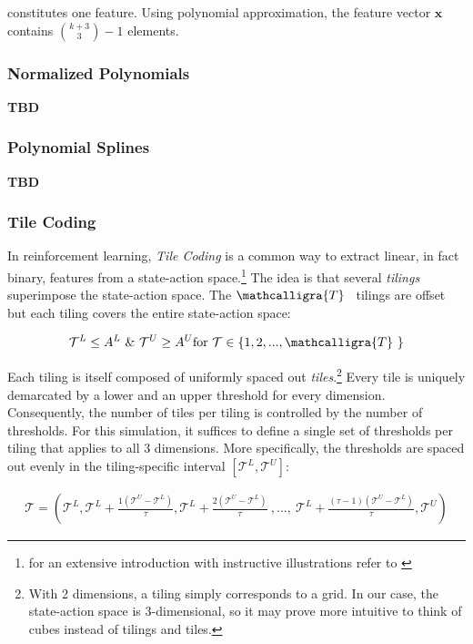 constitutes one feature. Using polynomial approximation, the feature vector $\boldsymbol{x}$ contains ${k + 3\choose3}  - 1$ elements.

\subsubsection{Normalized Polynomials}

\textbf{TBD}

\subsubsection{Polynomial Splines}

\textbf{TBD}

\subsubsection{Tile Coding}

In reinforcement learning, \emph{Tile Coding} is a common way to extract linear, in fact binary, features from a state-action space.\footnote{for an extensive introduction with instructive illustrations refer to \textcite{sutton_reinforcement_2018}} The idea is that several \emph{tilings} superimpose the state-action space. The $\mathcalligra{T}$ \ tilings are offset but each tiling covers the entire state-action space:

\begin{gather}
	 \mathcal{T}^L \leq A^L  ~ \& ~ \mathcal{T}^U \geq A^U    \text{for } \mathcal{T} \in \{1, 2, ..., \mathcalligra{T} ~ \}
\end{gather}

Each tiling is itself composed of uniformly spaced out \emph{tiles}.\footnote{With 2 dimensions, a tiling simply corresponds to a grid. In our case, the state-action space is 3-dimensional, so it may prove more intuitive to think of cubes instead of tilings and tiles.} Every tile is uniquely demarcated by a lower and an upper threshold for every dimension. Consequently, the number of tiles per tiling is controlled by the number of thresholds. For this simulation, it suffices to define a single set of thresholds per tiling that applies to all 3 dimensions. More specifically, the thresholds are spaced out evenly in the tiling-specific interval $[\mathcal{T}^L, \mathcal{T}^U]$:

\begin{gather}
\mathcal{T} = (
\mathcal{T}^L,
\mathcal{T}^L + \frac{1(\mathcal{T}^U - \mathcal{T}^L)}{\tau},
\mathcal{T}^L + \frac{2(\mathcal{T}^U - \mathcal{T}^L)}{\tau}~ , ... , ~
\mathcal{T}^L + \frac{(\tau-1)(\mathcal{T}^U - \mathcal{T}^L)}{\tau},
\mathcal{T}^U)
\end{gather}

